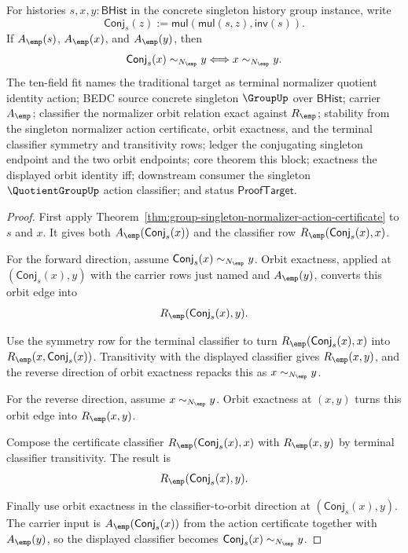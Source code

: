 \begin{theorem}
\label{thm:group-singleton-normalizer-action-orbit-identity-iff}
For histories $s,x,y:\mathsf{BHist}$ in the concrete singleton history group
instance, write
$$
\mathsf{Conj}_s(z):=\mathsf{mul}(\mathsf{mul}(s,z),\mathsf{inv}(s)).
$$
If $A_{\emp}(s)$, $A_{\emp}(x)$, and $A_{\emp}(y)$, then
$$
\mathsf{Conj}_s(x)\sim_{N_{\emp}}y \Longleftrightarrow
x\sim_{N_{\emp}}y.
$$
The ten-field fit names the traditional target as terminal normalizer quotient
identity action; BEDC source concrete singleton $\GroupUp$ over
$\mathsf{BHist}$; carrier $A_{\emp}$; classifier the normalizer orbit relation
exact against $R_{\emp}$; stability from the singleton normalizer action
certificate, orbit exactness, and the terminal classifier symmetry and
transitivity rows; ledger the conjugating singleton endpoint and the two orbit
endpoints; core theorem this block; exactness the displayed orbit identity iff;
downstream consumer the singleton $\QuotientGroupUp$ action classifier; and
status $\mathsf{ProofTarget}$.
\end{theorem}
\begin{proof}
First apply
Theorem~\ref{thm:group-singleton-normalizer-action-certificate} to $s$ and $x$.
It gives both $A_{\emp}(\mathsf{Conj}_s(x))$ and the classifier row
$R_{\emp}(\mathsf{Conj}_s(x),x)$.

For the forward direction, assume
$\mathsf{Conj}_s(x)\sim_{N_{\emp}}y$. Orbit exactness, applied at
$(\mathsf{Conj}_s(x),y)$ with the carrier rows just named and $A_{\emp}(y)$,
converts this orbit edge into
$$
R_{\emp}(\mathsf{Conj}_s(x),y).
$$

Use the symmetry row for the terminal classifier to turn
$R_{\emp}(\mathsf{Conj}_s(x),x)$ into
$R_{\emp}(x,\mathsf{Conj}_s(x))$. Transitivity with the displayed classifier
gives $R_{\emp}(x,y)$, and the reverse direction of orbit exactness repacks this
as $x\sim_{N_{\emp}}y$.

For the reverse direction, assume $x\sim_{N_{\emp}}y$. Orbit exactness at
$(x,y)$ turns this orbit edge into $R_{\emp}(x,y)$.

Compose the certificate classifier $R_{\emp}(\mathsf{Conj}_s(x),x)$ with
$R_{\emp}(x,y)$ by terminal classifier transitivity. The result is
$$
R_{\emp}(\mathsf{Conj}_s(x),y).
$$

Finally use orbit exactness in the classifier-to-orbit direction at
$(\mathsf{Conj}_s(x),y)$. The carrier input is
$A_{\emp}(\mathsf{Conj}_s(x))$ from the action certificate together with
$A_{\emp}(y)$, so the displayed classifier becomes
$\mathsf{Conj}_s(x)\sim_{N_{\emp}}y$.
\end{proof}
